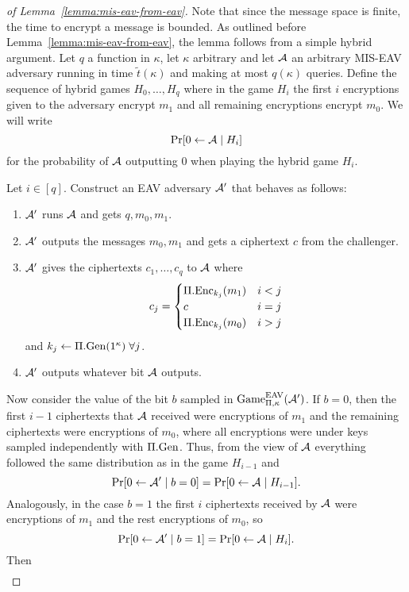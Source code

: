 \begin{proof}[of Lemma~\ref{lemma:mis-eav-from-eav}] Note that since the message space is finite, the time to encrypt a message is bounded. As outlined before Lemma~\ref{lemma:mis-eav-from-eav}, the lemma follows from a simple hybrid argument. Let $q$ a function in $\kappa$, let $\kappa$ arbitrary and let $\mathcal{A}$ an arbitrary MIS-EAV adversary running in time $\tilde{t}(\kappa)$ and making at most $q(\kappa)$ queries. Define the sequence of hybrid games $H_0, \ldots, H_q$ where in the game $H_i$ the first $i$ encryptions given to the adversary encrypt $m_1$ and all remaining encryptions encrypt $m_0$. We will write
	\[
		\pr{0 \from \adv \mid H_i}
	\]
	for the probability of $\mathcal{A}$ outputting $0$ when playing the hybrid game $H_i$.

	Let $i \in [q]$. Construct an EAV adversary $\mathcal{A}'$ that behaves as follows:
	\begin{enumerate}[1.]
		\item $\mathcal{A}'$ runs $\mathcal{A}$ and gets $q, m_0, m_1$.
		\item $\mathcal{A}'$ outputs the messages $m_0, m_1$ and gets a ciphertext $c$ from the challenger.
		\item $\mathcal{A}'$ gives the ciphertexts $c_1, \ldots, c_q$ to $\mathcal{A}$ where
		      \[
			      c_j = \begin{cases}
				      \Pi.\mathrm{Enc}_{k_j}(m_1) & i < j \\
				      c                   & i = j \\
				      \Pi.\mathrm{Enc}_{k_j}(m_0) & i > j
			      \end{cases}
		      \]
		      and $k_j \leftarrow \Pi.\mathrm{Gen}(1^\kappa) \; \forall j$.
		\item $\mathcal{A}'$ outputs whatever bit $\mathcal{A}$ outputs.
	\end{enumerate}
	Now consider the value of the bit $b$ sampled in $\mathrm{Game}_{\Pi, \kappa}^{\mathrm{EAV}}(\mathcal{A}')$. If $b = 0$, then the first $i - 1$ ciphertexts that $\mathcal{A}$ received were encryptions of $m_1$ and the remaining ciphertexts were encryptions of $m_0$, where all encryptions were under keys sampled independently with $\Pi.\mathrm{Gen}$. Thus, from the view of $\mathcal{A}$ everything followed the same distribution as in the game $H_{i - 1}$ and
	\[
		\pr{0 \from \adv' \mid b = 0} = \pr{0 \from \adv \mid H_{i - 1}}.
	\]
	Analogously, in the case $b = 1$ the first $i$ ciphertexts received by $\mathcal{A}$ were encryptions of $m_1$ and the rest encryptions of $m_0$, so
	\[
		\pr{0 \from \adv' \mid b = 1} = \pr{0 \from \adv \mid H_{i}}.
	\]
	Then
	\begin{align} \label{eq:eav-to-mis-eav-hybrid-distinguisher}

\end{align}
\end{proof}
